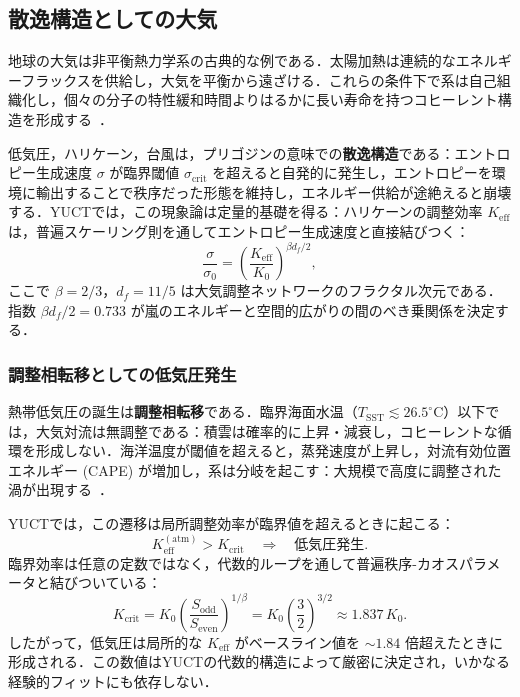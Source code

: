 \documentclass[11pt,a4paper]{article}
\newcommand{\Keff}{K_{\mathrm{eff}}}
\begin{document}
	\subsection{散逸構造としての大気}
	\label{subsec:atmo_diss}
	
	地球の大気は非平衡熱力学系の古典的な例である．太陽加熱は連続的なエネルギーフラックスを供給し，大気を平衡から遠ざける．これらの条件下で系は自己組織化し，個々の分子の特性緩和時間よりはるかに長い寿命を持つコヒーレント構造を形成する~\cite{Prigogine1977}．
	
	低気圧，ハリケーン，台風は，プリゴジンの意味での\textbf{散逸構造}である：エントロピー生成速度 $\sigma$ が臨界閾値 $\sigma_{\mathrm{crit}}$ を超えると自発的に発生し，エントロピーを環境に輸出することで秩序だった形態を維持し，エネルギー供給が途絶えると崩壊する．YUCTでは，この現象論は定量的基礎を得る：ハリケーンの調整効率 $\Keff$ は，普遍スケーリング則を通してエントロピー生成速度と直接結びつく：
	\begin{equation}
		\frac{\sigma}{\sigma_0} = \left( \frac{\Keff}{K_0} \right)^{\beta d_f / 2},
		\label{eq:cyclone_sigma}
	\end{equation}
	ここで $\beta = 2/3$，$d_f = 11/5$ は大気調整ネットワークのフラクタル次元である．指数 $\beta d_f / 2 = 0.733$ が嵐のエネルギーと空間的広がりの間のべき乗関係を決定する．
	
	\subsubsection*{調整相転移としての低気圧発生}
	
	熱帯低気圧の誕生は\textbf{調整相転移}である．臨界海面水温（$T_{\mathrm{SST}} \lesssim 26.5^{\circ}\mathrm{C}$）以下では，大気対流は無調整である：積雲は確率的に上昇・減衰し，コヒーレントな循環を形成しない．海洋温度が閾値を超えると，蒸発速度が上昇し，対流有効位置エネルギー (CAPE) が増加し，系は分岐を起こす：大規模で高度に調整された渦が出現する~\cite{Emanuel2003}．
	
	YUCTでは，この遷移は局所調整効率が臨界値を超えるときに起こる：
	\begin{equation}
		\Keff^{\mathrm{(atm)}} > K_{\mathrm{crit}} \quad \Longrightarrow \quad
		\text{低気圧発生}.
	\end{equation}
	臨界効率は任意の定数ではなく，代数的ループを通して普遍秩序-カオスパラメータと結びついている：
	\begin{equation}
		K_{\mathrm{crit}} = K_0 \left( \frac{S_{\mathrm{odd}}}{S_{\mathrm{even}}} \right)^{1/\beta}
		= K_0 \left( \frac{3}{2} \right)^{3/2} \approx 1.837\,K_0 .
	\end{equation}
	したがって，低気圧は局所的な $K_{\mathrm{eff}}$ がベースライン値を $\sim 1.84$ 倍超えたときに形成される．この数値はYUCTの代数的構造によって厳密に決定され，いかなる経験的フィットにも依存しない．
	
\end{document}
